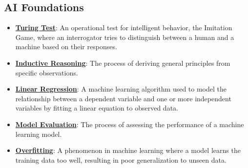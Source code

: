 \documentclass{article}%
\begin{document}
%
\subsection{AI Foundations}%
\label{subsec:AIFoundations}%
\begin{itemize}[leftmargin=*]%
\item \href{https://purdue.brightspace.com/d2l/common/assets/pdfjs-d2l-dist/1.0.14-legacy/web/viewer.html?file=\%2Fcontent\%2Fenforced\%2F1095467-wl.202510.CS.24300.001\%2F02L2-Intro.pdf\%3Fou\%3D1095467\&lang=en-us\&container=d2l-fileviewer-rendered-pdf\&fullscreen=d2l-fileviewer-rendered-pdf-dialog\&height=667#page=6}{\textbf{Turing Test}}: An operational test for intelligent behavior, the Imitation Game, where an interrogator tries to distinguish between a human and a machine based on their responses.%
\item \href{https://purdue.brightspace.com/d2l/common/assets/pdfjs-d2l-dist/1.0.14-legacy/web/viewer.html?file=\%2Fcontent\%2Fenforced\%2F1095467-wl.202510.CS.24300.001\%2F05L2-ML Basics.pdf\%3Fou\%3D1095467\&lang=en-us\&container=d2l-fileviewer-rendered-pdf\&fullscreen=d2l-fileviewer-rendered-pdf-dialog\&height=667#page=3}{\textbf{Inductive Reasoning}}: The process of deriving general principles from specific observations.%
\item \href{https://purdue.brightspace.com/d2l/common/assets/pdfjs-d2l-dist/1.0.14-legacy/web/viewer.html?file=\%2Fcontent\%2Fenforced\%2F1095467-wl.202510.CS.24300.001\%2F05L2-ML Basics.pdf\%3Fou\%3D1095467\&lang=en-us\&container=d2l-fileviewer-rendered-pdf\&fullscreen=d2l-fileviewer-rendered-pdf-dialog\&height=667#page=6}{\textbf{Linear Regression}}: A machine learning algorithm used to model the relationship between a dependent variable and one or more independent variables by fitting a linear equation to observed data.%
\item \href{https://purdue.brightspace.com/d2l/common/assets/pdfjs-d2l-dist/1.0.14-legacy/web/viewer.html?file=\%2Fcontent\%2Fenforced\%2F1095467-wl.202510.CS.24300.001\%2F05L2-ML Basics.pdf\%3Fou\%3D1095467\&lang=en-us\&container=d2l-fileviewer-rendered-pdf\&fullscreen=d2l-fileviewer-rendered-pdf-dialog\&height=667#page=8}{\textbf{Model Evaluation}}: The process of assessing the performance of a machine learning model.%
\item \href{https://purdue.brightspace.com/d2l/common/assets/pdfjs-d2l-dist/1.0.14-legacy/web/viewer.html?file=\%2Fcontent\%2Fenforced\%2F1095467-wl.202510.CS.24300.001\%2F05L2-ML Basics.pdf\%3Fou\%3D1095467\&lang=en-us\&container=d2l-fileviewer-rendered-pdf\&fullscreen=d2l-fileviewer-rendered-pdf-dialog\&height=667#page=14}{\textbf{Overfitting}}: A phenomenon in machine learning where a model learns the training data too well, resulting in poor generalization to unseen data.%

\end{itemize}
\end{document}
